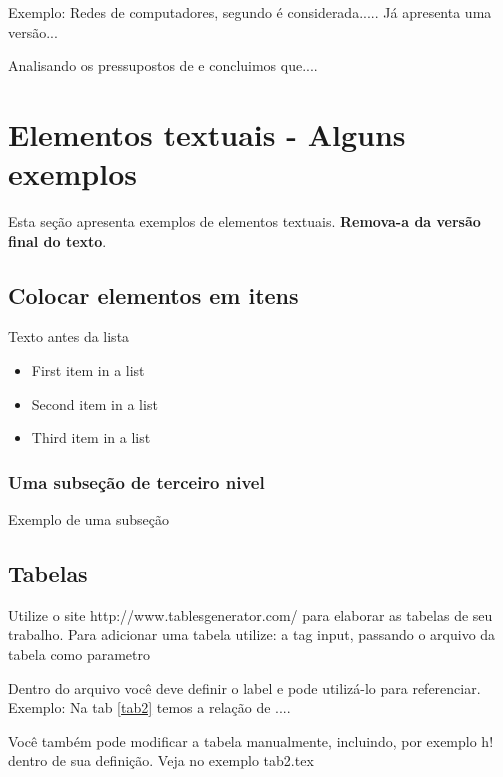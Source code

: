 \documentclass[	DIV=calc,%
							paper=a4,%
							fontsize=12pt,%
							onecolumn]{scrartcl}	 					%
\begin{document}
Exemplo: Redes de computadores, segundo \cite{scrumguide} é considerada..... Já \cite{leia77} apresenta uma versão...

Analisando os pressupostos de \cite{Buerger1989} e \cite{leia77} concluimos que....


 
\endgroup



\section{Elementos textuais - Alguns exemplos}

Esta seção apresenta exemplos de elementos textuais. \textbf{Remova-a da versão final do texto}.


\subsection{Colocar elementos em itens}

Texto antes da lista

\begin{itemize}
	\item First item in a list 
	\item Second item in a list 
	\item Third item in a list
\end{itemize}

\subsubsection{Uma subseção de terceiro nivel}

Exemplo de uma subseção

\subsection{Tabelas}

Utilize o site http://www.tablesgenerator.com/ para elaborar as tabelas de seu trabalho.
Para adicionar uma tabela utilize: a tag input, passando o arquivo da tabela como parametro



Dentro do arquivo você deve definir o label e pode utilizá-lo para referenciar. Exemplo:
Na tab \ref{tab2} temos a relação de ....


Você também pode modificar a tabela manualmente, incluindo, por exemplo h! dentro de sua definição. Veja no exemplo tab2.tex
\end{document}
